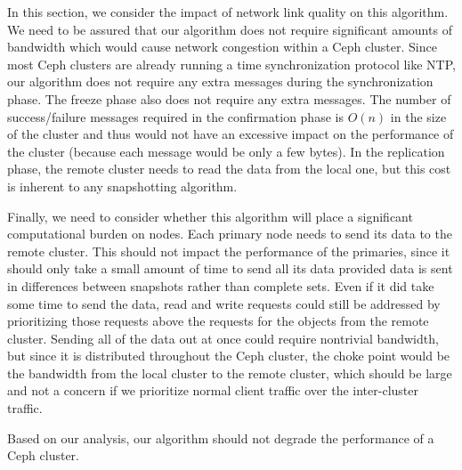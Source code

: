 In this section, we consider the impact of network link quality on
this algorithm. We need to be assured that our algorithm does not
require significant amounts of bandwidth which would cause network
congestion within a Ceph cluster. Since most Ceph clusters are already
running a time synchronization protocol like NTP, our algorithm does
not require any extra messages during the synchronization phase. The
freeze phase also does not require any extra messages. The number of
success/failure messages required in the confirmation phase is $O(n)$
in the size of the cluster and thus would not have an excessive impact
on the performance of the cluster (because each message would be only
a few bytes). In the replication phase, the remote cluster needs to
read the data from the local one, but this cost is inherent to any
snapshotting algorithm.

Finally, we need to consider whether this algorithm will place a
significant computational burden on nodes. Each primary node needs to
send its data to the remote cluster. This should not impact the
performance of the primaries, since it should only take a small amount
of time to send all its data provided data is sent in differences
between snapshots rather than complete sets. Even if it did take some
time to send the data, read and write requests could still be
addressed by prioritizing those requests above the requests for the
objects from the remote cluster. Sending all of the data out at once
could require nontrivial bandwidth, but since it is distributed
throughout the Ceph cluster, the choke point would be the bandwidth
from the local cluster to the remote cluster, which should be large
and not a concern if we prioritize normal client traffic over the
inter-cluster traffic.

Based on our analysis, our algorithm should not degrade the
performance of a Ceph cluster.

